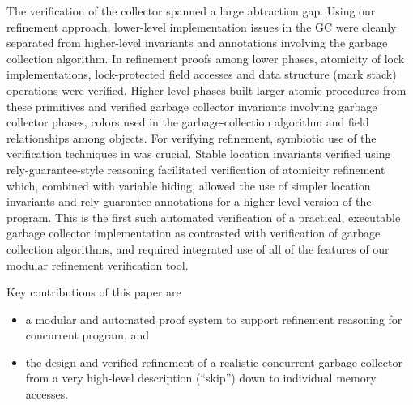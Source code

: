 The verification of the collector spanned a large abtraction gap. Using our refinement approach, lower-level implementation issues in the GC were cleanly separated from higher-level invariants and annotations involving the garbage collection algorithm. In refinement proofs among lower phases, atomicity of lock implementations, lock-protected field accesses and data structure (mark stack) operations were verified. Higher-level phases built larger atomic procedures from these primitives and verified garbage collector invariants involving garbage collector phases, colors used in the garbage-collection algorithm and field relationships among objects. For verifying refinement, symbiotic use of the verification techniques in \civl was crucial. Stable location invariants verified using rely-guarantee-style reasoning facilitated verification of atomicity refinement which, combined with variable hiding, allowed the use of simpler location invariants and rely-guarantee annotations for a higher-level version of the program.  This is the first such automated verification of a practical, executable garbage collector implementation as contrasted with verification of garbage collection algorithms, and required integrated use of all of the features of our modular refinement verification tool.


Key contributions of this paper are 
\begin{itemize}
\item a modular and automated proof system to support refinement reasoning for concurrent program, and 
\item the design and verified refinement of a realistic concurrent garbage collector from a very high-level description (``skip'') down to individual memory accesses.
\end{itemize}



